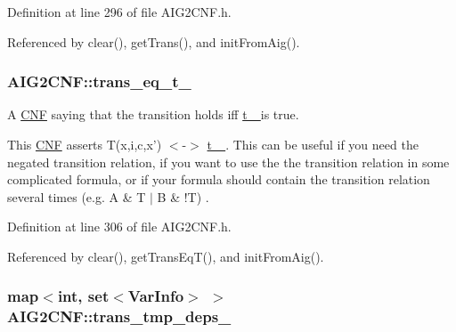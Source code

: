 Definition at line 296 of file A\-I\-G2\-C\-N\-F.\-h.



Referenced by clear(), get\-Trans(), and init\-From\-Aig().

\hypertarget{classAIG2CNF_af7e9b65092f626865a4aa541a48e4f1b}{
\subsubsection[{trans\-\_\-eq\-\_\-t\-\_\-}]{ A\-I\-G2\-C\-N\-F\-::trans\-\_\-eq\-\_\-t\-\_\-\hspace{0.3cm}{\ttfamily [protected]}}}\label{classAIG2CNF_af7e9b65092f626865a4aa541a48e4f1b}


A \hyperlink{classCNF}{C\-N\-F} saying that the transition holds iff \hyperlink{classAIG2CNF_af2a7f6ecdcec3b5b2f37a11b0adde65a}{t\-\_\- } is true. 

This \hyperlink{classCNF}{C\-N\-F} asserts T(x,i,c,x') $<$-\/$>$ \hyperlink{classAIG2CNF_af2a7f6ecdcec3b5b2f37a11b0adde65a}{t\-\_\- }. This can be useful if you need the negated transition relation, if you want to use the the transition relation in some complicated formula, or if your formula should contain the transition relation several times (e.\-g. A \& T $|$ B \& !\-T) . 

Definition at line 306 of file A\-I\-G2\-C\-N\-F.\-h.



Referenced by clear(), get\-Trans\-Eq\-T(), and init\-From\-Aig().

\hypertarget{classAIG2CNF_a8617860055dfa8cbcc1f572676f57b84}{
\subsubsection[{trans\-\_\-tmp\-\_\-deps\-\_\-}]{\setlength{\rightskip}{0pt plus 5cm}map$<$int, set$<${\bf Var\-Info}$>$ $>$ A\-I\-G2\-C\-N\-F\-::trans\-\_\-tmp\-\_\-deps\-\_\-\hspace{0.3cm}{\ttfamily [protected]}}}\label{classAIG2CNF_a8617860055dfa8cbcc1f572676f57b84}


